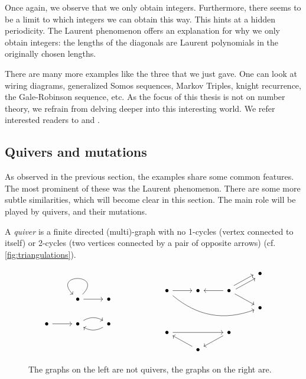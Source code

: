 %
Once again, we observe that we only obtain integers. Furthermore, there seems to be a
limit to which integers we can obtain this way. This hints at a hidden periodicity. The
Laurent phenomenon offers an explanation for why we only obtain integers: the lengths
of the diagonals are Laurent polynomials in the originally chosen lengths.

There are many more examples like the three that we just gave. One can look at wiring
diagrams, generalized Somos sequences, Markov Triples, knight recurrence, the
Gale-Robinson sequence, etc. As the focus of this thesis is not on number theory, we
refrain from delving deeper into this interesting world. We refer interested readers to
\cite[Chapter 3.4]{FominWilliams2021IntroductionCA_1-3} and
\cite{FominZelevinsky2002Laurent}.

\subsection{Quivers and mutations}

As observed in the previous section, the examples share some common features. The most
prominent of these was the Laurent phenomenon. There are some more subtle similarities,
which will become clear in this section. The main role will be played by quivers, and
their mutations.

\begin{definition}[Quivers]
	A \emph{quiver} is a finite directed (multi)-graph with no 1-cycles (vertex connected to itself) or 2-cycles (two vertices connected by a pair of opposite arrows) (cf. \cref{fig:triangulations}).
\end{definition}

\begin{figure}
	\centering
	\begin{equation*}
		\begin{tikzcd}
			&\bullet \arrow[loop] \arrow[r] &\bullet \\
			\bullet \rar & \bullet \arrow[r, bend left] & \bullet \arrow[l, bend left]
		\end{tikzcd}
		\hspace{2cm}
		\begin{tikzcd}[row sep=small]
			&&& \bullet \\
			\bullet \ar[rrrd, bend right]\rar &\bullet  \rar[leftarrow] &\bullet \ar[ru, shift left] \ar[ru, shift right] \ar[rd] \\
			&&& \bullet\\
			\\
			\bullet \ar[rr] && \bullet \ar[ld]\\
			& \bullet \ar[lu]
		\end{tikzcd}
	\end{equation*}
	\caption{The graphs on the left are not quivers, the graphs on the right are.}
	\label{fig:quivers}
\end{figure}

